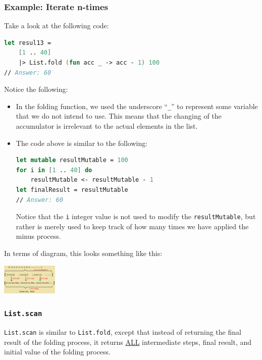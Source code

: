 \documentclass[12pt]{article}
\begin{document}
\subsubsection*{Example: Iterate n-times}
Take a look at the following code:
\begin{lstlisting}[language=FSharp]
let resul13 =
    [1 .. 40]
    |> List.fold (fun acc _ -> acc - 1) 100
// Answer: 60
\end{lstlisting}
Notice the following:
\begin{itemize}
\item In the folding function, we used the underscore ``\texttt{\_}'' to represent some variable that we do not intend to use. This means that the changing of the accumulator is irrelevant to the actual elements in the list.
\item The code above is similar to the following:
\begin{lstlisting}[language=FSharp]
let mutable resultMutable = 100
for i in [1 .. 40] do
    resultMutable <- resultMutable - 1
let finalResult = resultMutable
// Answer: 60
\end{lstlisting}
Notice that the \texttt{i} integer value is not used to modify the \texttt{resultMutable}, but rather is merely used to keep track of how many times we have applied the minus process.
\end{itemize}
In terms of diagram, this looks something like this:
\begin{center}
\includegraphics[width=0.2\textwidth]{pictures/picture35.png}
\end{center}

\pagebreak
\subsubsection*{\texttt{List.scan}}
\texttt{List.scan} is similar to \texttt{List.fold}, except that instead of returning the final result of the folding process, it returns \underline{ALL} intermediate steps, final result, and initial value of the folding process.
\end{document}
